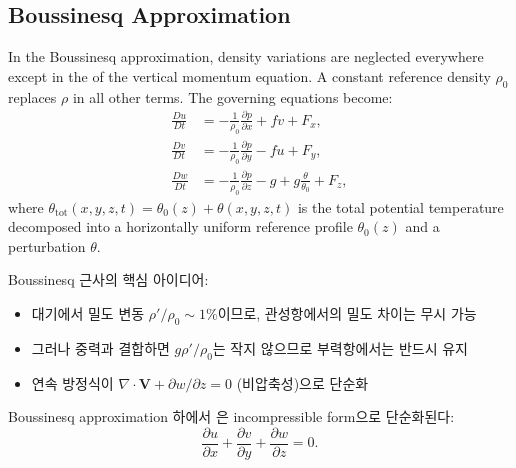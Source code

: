 \subsection{Boussinesq Approximation}\label{subsec:boussinesq}

\begin{definition}
In the Boussinesq approximation, density variations are neglected everywhere
except in the  of the vertical momentum equation.
A constant reference density $\rho_0$ replaces $\rho$ in all other terms.
The governing equations become:
\begin{align}
  \frac{Du}{Dt} &= -\frac{1}{\rho_0}\frac{\partial p}{\partial x}
                    + fv + F_x, \label{eq:bous-x}\\[4pt]
  \frac{Dv}{Dt} &= -\frac{1}{\rho_0}\frac{\partial p}{\partial y}
                    - fu + F_y, \label{eq:bous-y}\\[4pt]
  \frac{Dw}{Dt} &= -\frac{1}{\rho_0}\frac{\partial p}{\partial z}
                    - g + g\frac{\theta}{\theta_0} + F_z, \label{eq:bous-z}
\end{align}
where $\theta_{\mathrm{tot}}(x,y,z,t) = \theta_0(z) + \theta(x,y,z,t)$ is the
total potential temperature decomposed into a horizontally uniform reference
profile $\theta_0(z)$ and a perturbation $\theta$.
\end{definition}

\begin{hisublock}
Boussinesq 근사의 핵심 아이디어:
\begin{itemize}
  \item 대기에서 밀도 변동 $\rho'/\rho_0 \sim 1\%$이므로, 관성항에서의 밀도 차이는 무시 가능
  \item 그러나 중력과 결합하면 $g\rho'/\rho_0$는 작지 않으므로 부력항에서는 반드시 유지
  \item 연속 방정식이 $\nabla\cdot\mathbf{V} + \partial w/\partial z = 0$ (비압축성)으로 단순화
\end{itemize}
\end{hisublock}

\noindent
Boussinesq approximation 하에서 은
incompressible form으로 단순화된다:
\begin{equation}\label{eq:bous-cont}
  \frac{\partial u}{\partial x}
  + \frac{\partial v}{\partial y}
  + \frac{\partial w}{\partial z} = 0.
\end{equation}

